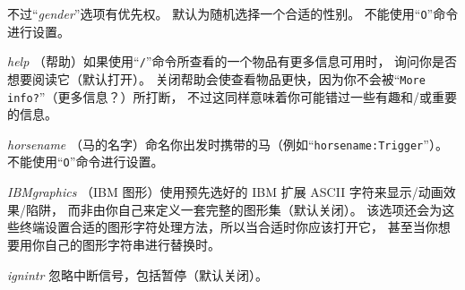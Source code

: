 \documentclass[a4paper, 10pt]{article}
\newcommand{\ib}[1]{\it #1 \hfill}
\begin{document}
不过“{\it gender}”选项有优先权。
默认为随机选择一个合适的性别。
不能使用“{\tt O}”命令进行设置。
\item[\ib{help}]
（帮助）如果使用“{\tt /}”命令所查看的一个物品有更多信息可用时，
询问你是否想要阅读它（默认打开）。
关闭帮助会使查看物品更快，因为你不会被“{\tt More info?}”（更多信息？）所打断，
不过这同样意味着你可能错过一些有趣和/或重要的信息。
\item[\ib{horsename}]
（马的名字）命名你出发时携带的马（例如“{\tt horsename:Trigger}”）。
不能使用“{\tt O}”命令进行设置。
\item[\ib{IBMgraphics}]
（IBM 图形）使用预先选好的 IBM 扩展 ASCII 字符来显示\zhTransDungeon{}/动画效果/陷阱，
而非由你自己来定义一套完整的图形集（默认关闭）。
该选项还会为这些终端设置合适的图形字符处理方法，所以当合适时你应该打开它，
甚至当你想要用你自己的图形字符串进行替换时。
\item[\ib{ignintr}]
忽略中断信号，包括暂停（默认关闭）。
\end{document}
